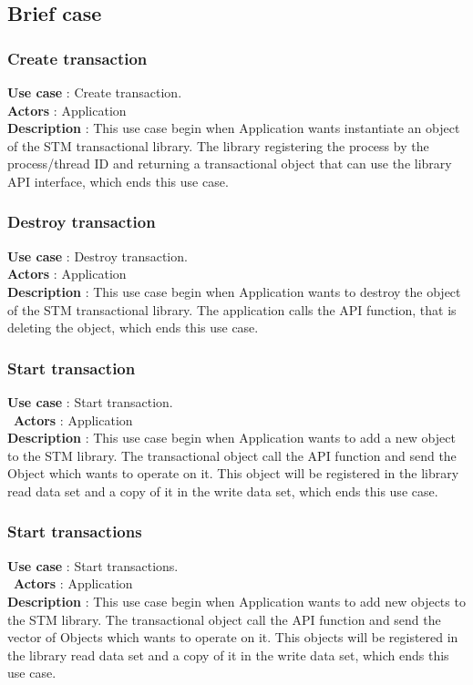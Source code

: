 \documentclass[12pt]{article}
\begin{document}
{\setlength{\parindent}{0cm}
\subsection{Brief case}
\subsubsection{Create transaction}
\textbf{Use case} : Create transaction.\\
\textbf{Actors} : Application\\
\textbf{Description} : This use case begin when Application wants instantiate an object of the STM transactional library. The library registering the process by the process/thread ID and returning a transactional object that can use the library API interface, which ends this use case.\\
\subsubsection{Destroy transaction}
\textbf{Use case} : Destroy transaction.\\
\textbf{Actors} : Application\\
\textbf{Description} : This use case begin when Application wants to destroy the object of the STM transactional library. The application calls the API function, that is deleting the object, which ends this use case.\\
\subsubsection{Start transaction}
\textbf{Use case} : Start transaction.\\\
\textbf{Actors} : Application\\
\textbf{Description} : This use case begin when Application wants to add a new object to the STM library. The transactional object call the API function and send the Object which wants to operate on it. This object will be registered in the library read data set and a copy of it in the write data set, which ends this use case.\\  
\subsubsection{Start transactions}
\textbf{Use case} : Start transactions.\\\
\textbf{Actors} : Application\\
\textbf{Description} : This use case begin when Application wants to add new objects to the STM library. The transactional object call the API function and send the vector of Objects which wants to operate on it. This objects will be registered in the library read data set and a copy of it in the write data set, which ends this use case.\\ 
}
\end{document}
